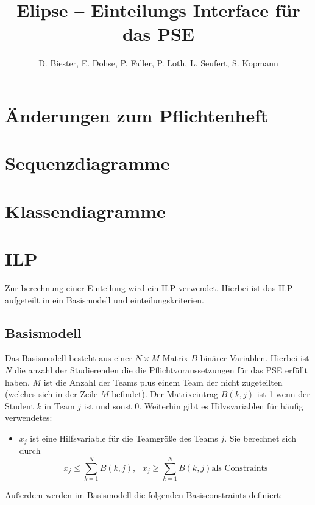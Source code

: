 \documentclass[parskip=full]{scrartcl}
\begin{document}
\title{Elipse -- Einteilungs Interface für das PSE}
\author{D. Biester, E. Dohse, P. Faller, P. Loth, L. Seufert, S. Kopmann}
\zweitgutachter{}

\tableofcontents
\pagebreak



\section{Änderungen zum Pflichtenheft}

\section{Sequenzdiagramme}

\section{Klassendiagramme}

\section{ILP}
Zur berechnung einer Einteilung wird ein ILP verwendet. Hierbei ist das ILP
aufgeteilt in ein Basismodell und einteilungskriterien.
\subsection{Basismodell}
Das Basismodell besteht aus einer $N \times M$ Matrix $B$ binärer Variablen.
Hierbei ist $N$ die anzahl der Studierenden die die Pflichtvoraussetzungen für das PSE
erfüllt haben. $M$ ist die Anzahl der Teams plus einem Team
der nicht zugeteilten (welches sich in der Zeile $M$ befindet). Der
Matrixeintrag $B(k,j)$ ist 1 wenn der Student $k$ in Team $j$ ist und sonst 0.
Weiterhin gibt es Hilvsvariablen für häufig verwendetes: 
\begin{itemize}
  \item $x_j$ ist eine Hilfsvariable für die Teamgröße des Teams $j$. Sie berechnet
sich durch
\begin{equation*}
x_j \le \sum_{k = 1}^{N} B(k,j) ,\text{ } x_j \ge \sum_{k = 1}^{N} B(k,j) \text{
als Constraints}
\end{equation*}
\end{itemize}


Außerdem werden im Basismodell die folgenden Basisconstraints definiert:
\end{document}
